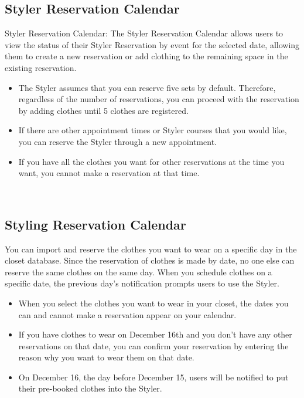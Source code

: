\documentclass[conference]{IEEEtran}
\begin{document}
\subsection{Styler Reservation Calendar}
Styler Reservation Calendar: The Styler Reservation Calendar allows users to view the status of their Styler Reservation by event for the selected date, allowing them to create a new reservation or add clothing to the remaining space in the existing reservation.
\begin{itemize}
    \item The Styler assumes that you can reserve five sets by default. Therefore, regardless of the number of reservations, you can proceed with the reservation by adding clothes until 5 clothes are registered.
    \item If there are other appointment times or Styler courses that you would like, you can reserve the Styler through a new appointment.
    \item If you have all the clothes you want for other reservations at the time you want, you cannot make a reservation at that time.\\
\end{itemize}
\\

\subsection{Styling Reservation Calendar}
You can import and reserve the clothes you want to wear on a specific day in the closet database. Since the reservation of clothes is made by date, no one else can reserve the same clothes on the same day. When you schedule clothes on a specific date, the previous day's notification prompts users to use the Styler.\\
\begin{itemize}
\item
When you select the clothes you want to wear in your closet, the dates you can and cannot make a reservation appear on your calendar.
\item
If you have clothes to wear on December 16th and you don't have any other reservations on that date, you can confirm your reservation by entering the reason why you want to wear them on that date.
\item
On December 16, the day before December 15, users will be notified to put their pre-booked clothes into the Styler.\\
\end{itemize}
\end{document}
